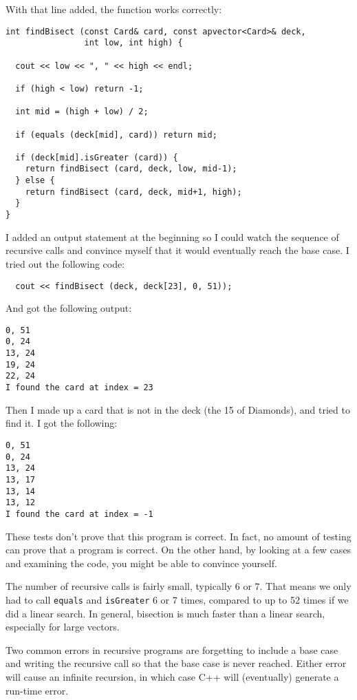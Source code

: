 With that line added, the function works correctly:

\begin{verbatim}
int findBisect (const Card& card, const apvector<Card>& deck,
                int low, int high) {

  cout << low << ", " << high << endl;

  if (high < low) return -1;

  int mid = (high + low) / 2;

  if (equals (deck[mid], card)) return mid;

  if (deck[mid].isGreater (card)) {
    return findBisect (card, deck, low, mid-1);
  } else {
    return findBisect (card, deck, mid+1, high);
  }
}
\end{verbatim}
%
I added an output statement at the beginning so I could watch
the sequence of recursive calls and convince myself
that it would eventually reach the base case.  I tried out the
following code:

\begin{verbatim}
  cout << findBisect (deck, deck[23], 0, 51));
\end{verbatim}
%
And got the following output:

\begin{verbatim}
0, 51
0, 24
13, 24
19, 24
22, 24
I found the card at index = 23
\end{verbatim}
%
Then I made up a card that is not in the deck (the 15 of Diamonds),
and tried to find it.  I got the following:

\begin{verbatim}
0, 51
0, 24
13, 24
13, 17
13, 14
13, 12
I found the card at index = -1
\end{verbatim}
%
These tests don't prove that this program is correct.  In fact, no
amount of testing can prove that a program is correct.  On the other
hand, by looking at a few cases and examining the code, you might be
able to convince yourself.


The number of recursive calls is fairly small, typically 6 or 7.  That
means we only had to call {\tt equals} and {\tt isGreater} 6 or 7
times, compared to up to 52 times if we did a linear search.  In
general, bisection is much faster than a linear search, especially for
large vectors.

Two common errors in recursive programs are forgetting to include a
base case and writing the recursive call so that the base case is never
reached.  Either error will cause an infinite recursion, in which case
C++ will (eventually) generate a run-time error.

